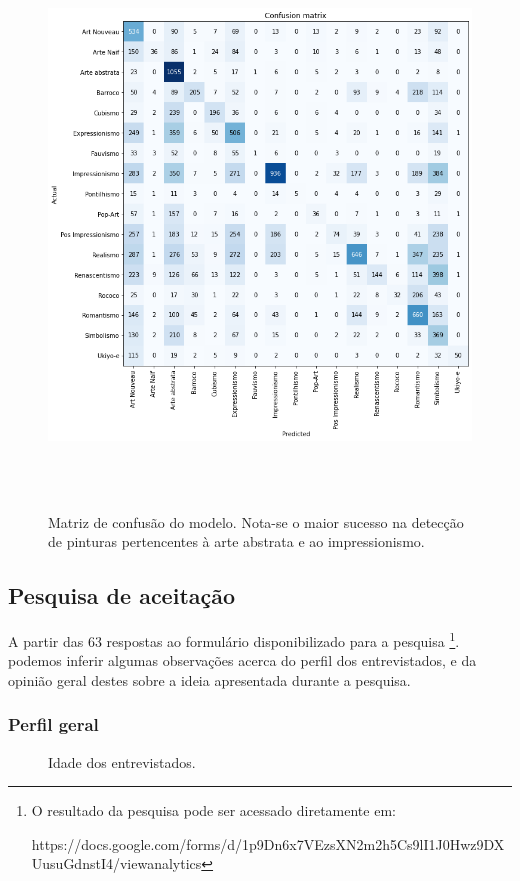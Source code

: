 \documentclass[12pt, a4paper]{article}
\begin{document}
\begin{figure}[H]
	\centering
	\includegraphics[width=\textwidth, height=15cm, keepaspectratio=true]{fig/confusionmatrix}
	\caption{Matriz de confusão do modelo. Nota-se o maior sucesso na detecção de pinturas pertencentes à arte abstrata e ao impressionismo.}
\end{figure}

\subsection{Pesquisa de aceitação}
A partir das 63 respostas ao formulário disponibilizado para a pesquisa
\footnote{
	O resultado da pesquisa pode ser acessado diretamente em:

	https://docs.google.com/forms/d/1p9Dn6x7VEzsXN2m2h5Cs9lI1J0Hwz9DXUusuGdnstI4/viewanalytics
}.
podemos inferir algumas observações acerca do perfil dos entrevistados, e da opinião geral destes sobre a ideia apresentada durante a pesquisa.

\subsubsection{Perfil geral}
\begin{figure}[H]
	\centering
	\caption{Idade dos entrevistados.}
	\label{fig:q1}
\end{figure}
\end{document}
